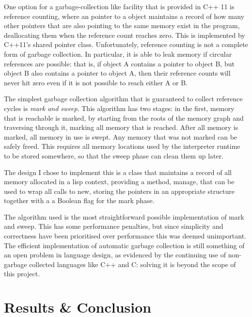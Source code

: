 \documentclass[12pt]{article}
\begin{document}
One option for a garbage-collection like facility that is provided in
C++ 11 is reference counting, where an pointer to a object maintains a
record of how many other pointers that are also pointing to the same
memory exist in the program, deallocating them when the reference
count reaches zero. This is implemented by C++11's shared pointer
class. Unfortunately, reference counting is not a complete form of
garbage collection. In particular, it is able to leak memory if
circular references are possible: that is, if object A contains a
pointer to object B, but object B also contains a pointer to object A,
then their reference counts will never hit zero even if it is not
possible to reach either A or B.


The simplest garbage collection algorithm that is guaranteed to
collect reference cycles is \textit{mark and sweep}. This algorithm
has two stages: in the first, memory that is reachable is marked, by
starting from the roots of the memory graph and traversing through it,
marking all memory that is reached. After all memory is marked, all
memory in use is swept. Any memory that was not marked can be safely
freed. This requires all memory locations used by the interpreter
runtime to be stored somewhere, so that the sweep phase can clean them
up later.

The design I chose to implement this is a class that maintains a
record of all memory allocated in a lisp context, providing a method,
manage, that can be used to wrap all calls to new, storing the
pointers in an appropriate structure together with a a Boolean flag
for the mark phase.


The algorithm used is the most straightforward possible implementation
of mark and sweep. This has some performance penalties, but since
simplicity and correctness have been prioritised over performance this
was deemed unimportant. The efficient implementation of automatic
garbage collection is still something of an open problem in language
design, as evidenced by the continuing use of non-garbage collected
languages like C++ and C: solving it is beyond the scope of this
project.

\section{Results \& Conclusion}
\end{document}
